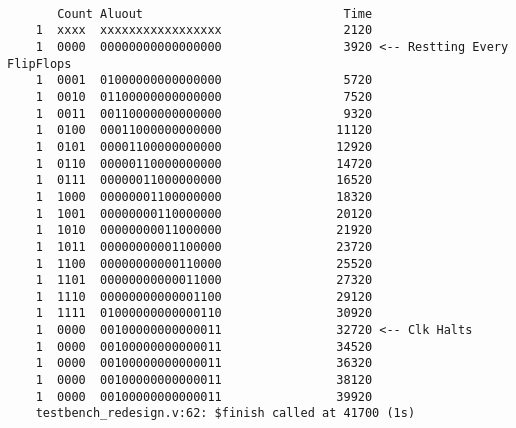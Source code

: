 \documentclass[../main]{subfiles}
\begin{document}
\begin{verbatim}

       Count Aluout                            Time
    1  xxxx  xxxxxxxxxxxxxxxxx                 2120
    1  0000  00000000000000000                 3920 <-- Restting Every FlipFlops
    1  0001  01000000000000000                 5720
    1  0010  01100000000000000                 7520
    1  0011  00110000000000000                 9320
    1  0100  00011000000000000                11120
    1  0101  00001100000000000                12920
    1  0110  00000110000000000                14720
    1  0111  00000011000000000                16520
    1  1000  00000001100000000                18320
    1  1001  00000000110000000                20120
    1  1010  00000000011000000                21920
    1  1011  00000000001100000                23720
    1  1100  00000000000110000                25520
    1  1101  00000000000011000                27320
    1  1110  00000000000001100                29120
    1  1111  01000000000000110                30920
    1  0000  00100000000000011                32720 <-- Clk Halts
    1  0000  00100000000000011                34520
    1  0000  00100000000000011                36320
    1  0000  00100000000000011                38120
    1  0000  00100000000000011                39920
    testbench_redesign.v:62: $finish called at 41700 (1s)

\end{verbatim}
\end{document}
